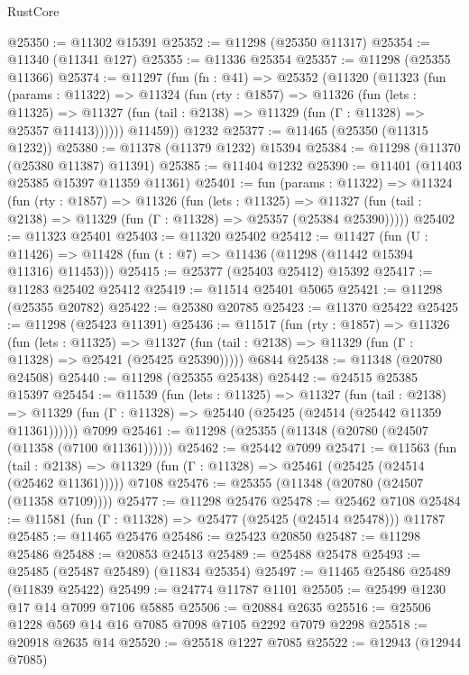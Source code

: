 \begin{lexlean}{RustCore}
\begin{coremodule}
@25350 := @11302 @15391
@25352 := @11298 (@25350 @11317)
@25354 := @11340 (@11341 @127)
@25355 := @11336 @25354
@25357 := @11298 (@25355 @11366)
@25374 := @11297
    (fun (fn : @41) =>
    @25352
      (@11320
        (@11323
          (fun (params : @11322) =>
          @11324
            (fun (rty : @1857) =>
            @11326
              (fun (lets : @11325) =>
              @11327 (fun (tail : @2138) => @11329 (fun (Γ : @11328) => @25357 @11413))))))
        @11459))
    @1232
@25377 := @11465 (@25350 (@11315 @1232))
@25380 := @11378 (@11379 @1232) @15394
@25384 := @11298 (@11370 (@25380 @11387) @11391)
@25385 := @11404 @1232
@25390 := @11401 (@11403 @25385 @15397 @11359 @11361)
@25401 := fun (params : @11322) =>
  @11324
    (fun (rty : @1857) =>
    @11326
      (fun (lets : @11325) =>
      @11327 (fun (tail : @2138) => @11329 (fun (Γ : @11328) => @25357 (@25384 @25390)))))
@25402 := @11323 @25401
@25403 := @11320 @25402
@25412 := @11427
    (fun (U : @11426) => @11428 (fun (t : @7) => @11436 (@11298 (@11442 @15394 @11316) @11453)))
@25415 := @25377 (@25403 @25412) @15392
@25417 := @11283 @25402 @25412
@25419 := @11514 @25401 @5065
@25421 := @11298 (@25355 @20782)
@25422 := @25380 @20785
@25423 := @11370 @25422
@25425 := @11298 (@25423 @11391)
@25436 := @11517
    (fun (rty : @1857) =>
    @11326
      (fun (lets : @11325) =>
      @11327 (fun (tail : @2138) => @11329 (fun (Γ : @11328) => @25421 (@25425 @25390)))))
    @6844
@25438 := @11348 (@20780 @24508)
@25440 := @11298 (@25355 @25438)
@25442 := @24515 @25385 @15397
@25454 := @11539
    (fun (lets : @11325) =>
    @11327
      (fun (tail : @2138) =>
      @11329 (fun (Γ : @11328) => @25440 (@25425 (@24514 (@25442 @11359 @11361))))))
    @7099
@25461 := @11298 (@25355 (@11348 (@20780 (@24507 (@11358 (@7100 @11361))))))
@25462 := @25442 @7099
@25471 := @11563
    (fun (tail : @2138) => @11329 (fun (Γ : @11328) => @25461 (@25425 (@24514 (@25462 @11361)))))
    @7108
@25476 := @25355 (@11348 (@20780 (@24507 (@11358 @7109))))
@25477 := @11298 @25476
@25478 := @25462 @7108
@25484 := @11581 (fun (Γ : @11328) => @25477 (@25425 (@24514 @25478))) @11787
@25485 := @11465 @25476
@25486 := @25423 @20850
@25487 := @11298 @25486
@25488 := @20853 @24513
@25489 := @25488 @25478
@25493 := @25485 (@25487 @25489) (@11834 @25354)
@25497 := @11465 @25486 @25489 (@11839 @25422)
@25499 := @24774 @11787 @1101
@25505 := @25499 @1230 @17 @14 @7099 @7106 @5885
@25506 := @20884 @2635
@25516 := @25506 @1228 @569 @14 @16 @7085 @7098 @7105 @2292 @7079 @2298
@25518 := @20918 @2635 @14
@25520 := @25518 @1227 @7085
@25522 := @12943 (@12944 @7085)

\end{coremodule}
\end{lexlean}
